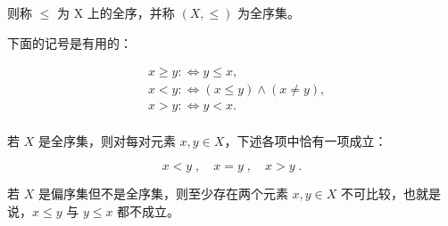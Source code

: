 则称  $ \leq $ 为 X 上的全序，并称  $ (X,\leq) $ 为全序集。

\begin{remark}

\begin{items}
\item

下面的记号是有用的：

\begin{equation*}
\begin{aligned}
&x\geq y:\Longleftrightarrow y\leq x,\\&x<y:\Longleftrightarrow(x\leq y)\land(x\neq y),\\&x>y:\Longleftrightarrow y<x.\\
\end{aligned}
\end{equation*}
\item

若 $X$ 是全序集，则对每对元素 $x, y \in X$，下述各项中恰有一项成立：

\[
x<y\;,\quad x=y\;,\quad x>y\;.
\]

若 $X$ 是偏序集但不是全序集，则至少存在两个元素 $x, y \in X$ 不可比较，也就是说，$x \leq y$ 与 $y \leq x$ 都不成立。

\end{items}

\end{remark}

